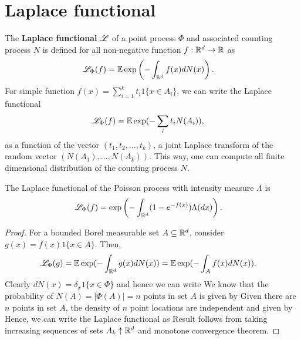 \documentclass[a4paper,english,10pt]{article}
\begin{document}
\section{Laplace functional}
The \textbf{Laplace functional} $\mathscr{L}$ of a point process $\Phi$ and associated counting process $N$ is defined for all non-negative function $f: \mathbb{R}^d \to \mathbb{R}$ as 
\begin{align*}
\mathscr{L}_{\Phi}(f) &= \mathbb{E} \exp\left(-\int_{\mathbb{R}^d}f(x)dN(x)\right).
\end{align*}
For simple function $f(x) = \sum_{i = 1}^{k}t_i1\{x \in A_i\}$, we can write the Laplace functional 
\begin{align*}
\mathscr{L}_{\Phi}(f) &= \mathbb{E}\exp(-\sum_{i}t_iN(A_i)),
\end{align*}
as a function of the vector $(t_1, t_2, \dots, t_k)$, a joint Laplace transform of the random vector $(N(A_1), \dots, N(A_k))$. 
This way, one can compute all finite dimensional distribution of the counting process $N$. 
\begin{prop}
The Laplace functional of the Poisson process with intensity measure $\Lambda$ is 
\begin{align*}
\mathscr{L}_{\Phi}(f) &= \exp\left(-\int_{\mathbb{R}^d}(1-e^{-f(x)})\Lambda(dx)\right).
\end{align*}  
\end{prop}
\begin{proof}
For a bounded Borel measurable set $A \subseteq \mathbb{R}^d$, consider $g(x) = f(x)1\{x \in A\}$. 
Then,
\begin{align*}
\mathscr{L}_{\Phi}(g) &= \mathbb{E}\exp(-\int_{\mathbb{R}^d}g(x)dN(x)) = \mathbb{E}\exp(-\int_{A}f(x)dN(x)).
\end{align*} 
Clearly $dN(x) = \delta_{x}1\{x \in \Phi\}$ and hence we can write 
We know that the probability of $N(A) = |\Phi(A)| = n$ points in set $A$ is given by 
Given there are $n$ points in set $A$, the density of $n$ point locations are independent and given by
Hence, we can write the Laplace functional as 
Result follows from taking increasing sequences of sets $A_k \uparrow \mathbb{R}^d$ and monotone convergence theorem.
\end{proof}
\end{document}
